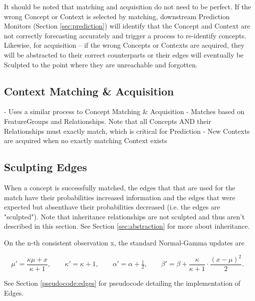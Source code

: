 \documentclass{article}
\begin{document}
It should be noted that matching and acquisition do not need to be perfect. If the wrong Concept or Context is selected by matching, downstream Prediction Monitors (Section \ref{sec:prediction}) will identify that the Concept and Context are not correctly forecasting accurately and trigger a process to re-identify concepts. Likewise, for acquisition -- if the wrong Concepts or Contexts are acquired, they will be abstracted to their correct counterparts or their edges will eventually be Sculpted to the point where they are unreachable and forgotten.

\subsection{Context Matching \& Acquisition}
- Uses a similar process to Concept Matching \& Acquisition
- Matches based on FeatureGroups and Relationships. Note that all Concepts AND their Relationships must exactly match, which is critical for Prediction
- New Contexts are acquired when no exactly matching Context exists

\subsection{Sculpting Edges}\label{sec:sculpting}
When a concept is successfully matched, the edges that that are used for the match have their probabilities increased information and the edges that were expected but absenthave their probabilities decreased (i.e. the edges are "sculpted"). Note that inheritance relationships are not sculpted and thus aren't described in this section. See Section \ref{sec:abstraction} for more about inheritance.

On the n-th consistent observation x, the standard Normal-Gamma updates are

$$\mu' = \frac{\kappa\mu + x}{\kappa + 1}, \qquad \kappa' = \kappa + 1, \qquad \alpha' = \alpha + \tfrac{1}{2}, \qquad \beta' = \beta + \frac{\kappa}{\kappa+1}\cdot\frac{(x - \mu)^2}{2}.$$

See Section \ref{pseudocode:edges} for pseudocode detailing the implementation of Edges.
\end{document}
